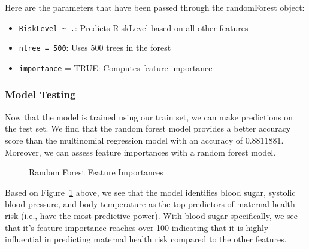 \documentclass[
  letterpaper,
  DIV=11,
  numbers=noendperiod]{scrartcl}
\providecommand{\tightlist}{%
  \setlength{\itemsep}{0pt}\setlength{\parskip}{0pt}}\usepackage{longtable,booktabs,array}
\begin{document}
Here are the parameters that have been passed through the randomForest
object:

\begin{itemize}
\tightlist
\item
  \texttt{RiskLevel\ \textasciitilde{}\ .}: Predicts RiskLevel based on
  all other features
\item
  \texttt{ntree\ =\ 500}: Uses 500 trees in the forest
\item
  \texttt{importance} = TRUE: Computes feature importance
\end{itemize}

\subsubsection{Model Testing}\label{model-testing-1}

Now that the model is trained using our train set, we can make
predictions on the test set. We find that the random forest model
provides a better accuracy score than the multinomial regression model
with an accuracy of 0.8811881. Moreover, we can assess feature
importances with a random forest model.

\begin{figure}


\caption{\label{fig-rf-feat-importance}Random Forest Feature
Importances}

\end{figure}%

Based on Figure~\ref{fig-rf-feat-importance} above, we see that the
model identifies blood sugar, systolic blood pressure, and body
temperature as the top predictors of maternal health risk (i.e., have
the most predictive power). With blood sugar specifically, we see that
it's feature importance reaches over 100 indicating that it is highly
influential in predicting maternal health risk compared to the other
features.
\end{document}
